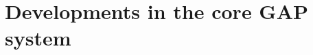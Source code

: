 \documentclass{deliverablereport}
\author{Author names}
\begin{document}
\maketitle
\githubissuedescription



\section{Developments in the core GAP system}

%
%
%
%
%
%
%
%
%
%
%
%
%
%
%
%
%
%
%
%
%
%
%
%
%
%
\end{document}
